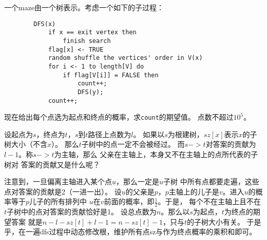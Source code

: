 \begin{prob}
	一个maze由一个树表示。考虑一个如下的子过程：
	\begin{verbatim}
	    DFS(x)
	        if x == exit vertex then
	            finish search
	        flag[x] <- TRUE
	        random shuffle the vertices' order in V(x) 
	        for i <- 1 to length[V] do
	            if flag[V[i]] = FALSE then
	                count++;
	                DFS(y);
	        count++;
	\end{verbatim} 
	\par
	现在给出每个点选为起点和终点的概率，求\verb#count#的期望值。
	点数不超过$10^5$。
\end{prob}

\begin{sol}
	设起点为$s$，终点为$t$，$s$到$t$路径上点数为$l$。
	如果以$s$为根建树，$sz[x]$表示$x$的子树大小（不含$x$）。
	那么$t$子树中的点一定不会被经过。
	而$s->t$对答案的贡献为$l-1$。称$s->t$为主轴，那么
	父亲在主轴上，本身又不在主轴上的点所代表的子树对
	答案的贡献又是什么呢？ \par
	注意到，一旦偏离主轴进入某个点$u$，那么一定是$u$子树
	中所有点都要走遍，这些点对答案的贡献是2（一进一出）。
	设$u$的父亲是$p$，$p$主轴上的儿子是$v$。进入$u$的概率等于$p$儿子的所有排列中
	$u$在$v$前面的概率，即$\frac{1}{2}$。于是，
	每个不在主轴上且不在$t$子树中的点对答案的贡献恰好是1。
	设总点数为$n$。那么以$s$为起点，$t$为终点的期望答案
	就是$n-l-sz[t]+l-1 = n-sz[t]-1$，只与$t$的子树大小有关。
	于是乎，在一遍dfs过程中动态修改根，维护所有点sz与作为终点概率的乘积和即可。
\end{sol}
